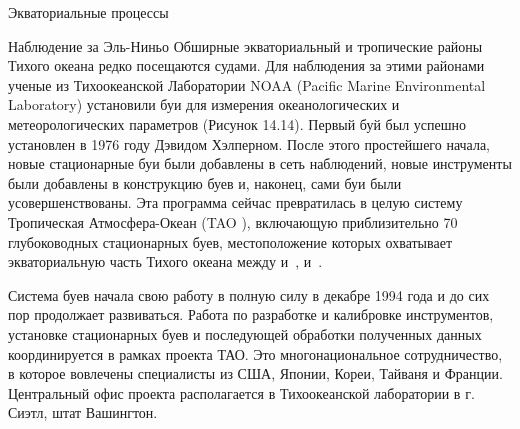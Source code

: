 \begin{chapter}{Экваториальные процессы}
\begin{section}{Наблюдение за Эль-Ниньо}
Обширные экваториальный и тропические районы Тихого океана редко
посещаются судами. Для наблюдения за этими районами ученые из
Тихоокеанской Лаборатории NOAA (Pacific Marine Environmental
Laboratory) установили буи для измерения океанологических и
метеорологических параметров (Рисунок 14.14). Первый буй был успешно
установлен в 1976 году Дэвидом Хэлперном. После этого простейшего
начала, новые стационарные буи были добавлены в сеть наблюдений, новые
инструменты были добавлены в конструкцию буев и, наконец, сами буи
были усовершенствованы. Эта программа сейчас превратилась в целую
систему Тропическая Атмосфера-Океан (TAO ), включающую приблизительно
70 глубоководных стационарных буев, местоположение которых охватывает
экваториальную часть Тихого океана между  и~, 
 и~.
%

Система буев начала свою работу в полную силу в декабре 1994 года и до
сих пор продолжает развиваться. Работа по разработке и калибровке
инструментов, установке стационарных буев и последующей обработки
полученных данных координируется в рамках проекта ТАО. Это
многонациональное сотрудничество, в которое вовлечены специалисты из
США, Японии, Кореи, Тайваня и Франции. Центральный офис проекта
располагается в Тихоокеанской лаборатории в г. Сиэтл, штат Вашингтон.
%


\end{section}
\end{chapter}
